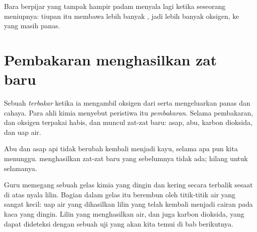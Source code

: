 \begin{example}\label{ex:g4:what-a-fire-needs:embers}
Bara berpijar yang tampak hampir padam menyala lagi ketika seseorang
meniupnya: tiupan itu membawa lebih banyak , jadi lebih banyak
oksigen, ke  yang masih panas.
\end{example}

\section{Pembakaran menghasilkan zat baru}

\begin{definition}\label{def:g4:what-a-fire-needs:burning}
Sebuah  \emph{terbakar} ketika ia mengambil
oksigen dari  serta mengeluarkan panas dan cahaya. Para ahli kimia
menyebut peristiwa itu \emph{pembakaran}. Selama
pembakaran,  dan oksigen terpakai habis, dan muncul zat-zat
baru: asap, abu, karbon dioksida, dan uap air.
\end{definition}

\begin{proposition}\label{prop:g4:what-a-fire-needs:new}
Abu dan asap api tidak berubah kembali menjadi kayu, selama apa pun kita
menunggu.  menghasilkan zat-zat baru yang sebelumnya tidak
ada;  hilang untuk selamanya.
\end{proposition}

\begin{inthelab}
Guru memegang sebuah gelas kimia yang dingin dan kering secara terbalik
sesaat di atas nyala lilin. Bagian dalam gelas itu berembun oleh
titik-titik air yang sangat kecil: uap air yang dihasilkan lilin yang
 telah kembali menjadi cairan pada kaca yang dingin. Lilin yang
 menghasilkan air, dan juga karbon dioksida, yang dapat
dideteksi dengan sebuah uji yang akan kita temui di bab berikutnya.
\end{inthelab}

